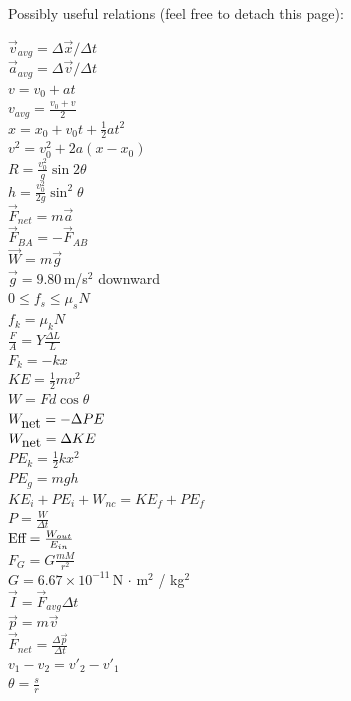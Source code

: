 \documentclass[letterpaper,addpoints,answers]{exam}
\begin{document}
 \pagebreak
 
 {\Large Possibly useful relations (feel free to detach this page):}
  
 \fontseries{\seriesdefault}
 \begin{multicols}{2}
 \large
 \noindent
 $\vec{v}_{avg} = \Delta\vec{x} / \Delta t$ \\
 $\vec{a}_{avg} = \Delta\vec{v} / \Delta t$ \\
 $v = v_0 + a t$ \\
 $v_{avg} = \frac{v_0 + v}{2}$ \\
 $x = x_0 + v_0 t + \frac{1}{2} a t^2$ \\
 $v^2 = v_0^2 + 2 a (x - x_0)$ \\
 $R = \frac{v_0^2}{g}\sin 2\theta$ \\
 $h = \frac{v_0^2}{2 g} \sin^2 \theta$ \\
 $\vec{F}_{net} = m \vec{a}$ \\
 $\vec{F}_{BA} = - \vec{F}_{AB}$ \\
 $\vec{W} = m \vec{g}$ \\
 $\vec{g} = 9.80\,$m/s$^2$ downward \\
 $0 \le f_s \le \mu_s N$ \\
 $f_k = \mu_k N$ \\
 $\frac{F}{A} = Y \frac{\Delta L}{L}$ \\
 $F_k = -k x$ \\
 $KE = \frac{1}{2} m v^2$ \\
 $W = F d \cos\theta$ \\
 $W_{\hbox{net}} = -\Delta PE$ \\
 $W_{\hbox{net}} = \Delta KE$ \\
 $PE_k = \frac{1}{2} k x^2$ \\
 $PE_g = m g h$ \\
 $KE_i + PE_i + W_{nc} = KE_f + PE_f$ \\
 $P = \frac{W}{\Delta t}$ \\
 $\hbox{Eff} = \frac{W_{out}}{E_{in}}$ \\
 $F_G = G \frac{m M}{r^2}$ \\
 $G = 6.67 \times 10^{-11}\,$N $\cdot$ m$^2$ / kg$^2$ \\
 $\vec{I} = \vec{F}_{avg} \Delta t$ \\
 $\vec{p} = m \vec{v}$ \\
 $\vec{F}_{net} = \frac{\Delta \vec{p}}{\Delta t}$ \\
 $v_1 - v_2 = v'_2 - v'_1$ \\
 $\theta = \frac{s}{r}$ \\

\end{multicols}
\end{document}
